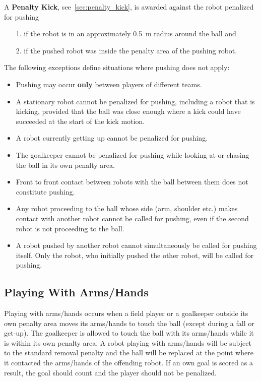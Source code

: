 A \textbf{Penalty Kick}, see~\cref{sec:penalty_kick}, is awarded against the robot penalized for pushing
\begin{itemize}
  \item[1.] if the robot is in an approximately \qty{0.5}{\metre} radius around the ball and
  \item[2.] if the pushed robot was inside the penalty area of the pushing robot.
\end{itemize}

The following exceptions define situations where pushing does not apply:
\begin{itemize}
  \item Pushing may occur \textbf{only} between players of different teams.
  \item A stationary robot cannot be penalized for pushing, including a robot that is kicking, provided that the ball was close enough where a kick could have succeeded at the start of the kick motion.
  \item A robot currently getting up cannot be penalized for pushing.
  \item The goalkeeper cannot be penalized for pushing while looking at or chasing the ball in its own penalty area.
  \item Front to front contact between robots with the ball between them does not constitute pushing.
  \item Any robot proceeding to the ball whose side (\ie arm, shoulder etc.) makes contact with another robot cannot be called for pushing, even if the second robot is not proceeding to the ball.
  \item A robot pushed by another robot cannot simultaneously be called for pushing itself.
    Only the robot, who initially pushed the other robot, will be called for pushing.
\end{itemize}

\subsection{Playing With Arms/Hands}
\label{sec:hand_ball}

Playing with arms/hands occurs when a field player or a goalkeeper outside its own penalty area moves its arms/hands to touch the ball (except during a fall or get-up).
The goalkeeper is allowed to touch the ball with its arms/hands while it is within its own penalty area.
A robot playing with arms/hands will be subject to the standard removal penalty and the ball will be replaced at the point where it contacted the arms/hands of the offending robot.
If an own goal is scored as a result, the goal should count and the player should not be penalized.

